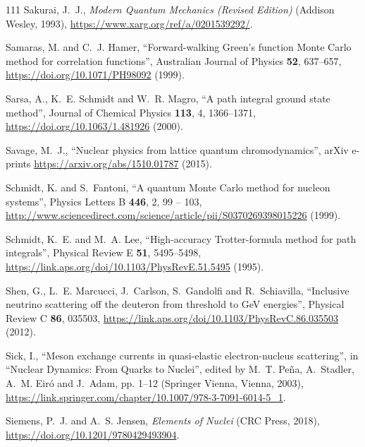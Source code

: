 \documentclass[12pt,letterpaper,UTF8]{report}
\begin{document}
{\begin{thebibliography}{111}
Sakurai, J.~J., \emph{Modern Quantum Mechanics (Revised Edition)} (Addison
  Wesley, 1993), \urlprefix\url{https://www.xarg.org/ref/a/0201539292/}.

Samaras, M. and C.~J. Hamer, \enquote{Forward-walking {Green}'s function
  {Monte} {Carlo} method for correlation functions}, Australian Journal of
  Physics \textbf{52}, 637--657,
  \urlprefix\url{https://doi.org/10.1071/PH98092} (1999).

Sarsa, A., K.~E. Schmidt and W.~R. Magro, \enquote{A path integral ground state
  method}, Journal of Chemical Physics \textbf{113}, 4, 1366--1371,
  \urlprefix\url{https://doi.org/10.1063/1.481926} (2000).

Savage, M.~J., \enquote{Nuclear physics from lattice quantum chromodynamics},
  arXiv e-prints \urlprefix\url{https://arxiv.org/abs/1510.01787} (2015).

Schmidt, K. and S.~Fantoni, \enquote{A quantum {Monte} {Carlo} method for
  nucleon systems}, Physics Letters B \textbf{446}, 2, 99 -- 103,
  \urlprefix\url{http://www.sciencedirect.com/science/article/pii/S0370269398015226}
  (1999).

Schmidt, K.~E. and M.~A. Lee, \enquote{High-accuracy {Trotter}-formula method
  for path integrals}, Physical Review E \textbf{51}, 5495--5498,
  \urlprefix\url{https://link.aps.org/doi/10.1103/PhysRevE.51.5495} (1995).

Shen, G., L.~E. Marcucci, J.~Carlson, S.~Gandolfi and R.~Schiavilla,
  \enquote{Inclusive neutrino scattering off the deuteron from threshold to
  {GeV} energies}, Physical Review C \textbf{86}, 035503,
  \urlprefix\url{https://link.aps.org/doi/10.1103/PhysRevC.86.035503} (2012).

Sick, I., \enquote{Meson exchange currents in quasi-elastic electron-nucleus
  scattering}, in \enquote{Nuclear Dynamics: From Quarks to Nuclei}, edited by
  M.~T. Pe{\~{n}}a, A.~Stadler, A.~M. Eir{\'o} and J.~Adam, pp. 1--12 (Springer
  Vienna, Vienna, 2003),
  \urlprefix\url{https://link.springer.com/chapter/10.1007/978-3-7091-6014-5_1}.

Siemens, P.~J. and A.~S. Jensen, \emph{Elements of Nuclei} ({CRC} Press, 2018),
  \urlprefix\url{https://doi.org/10.1201/9780429493904}.


\end{thebibliography}}
\end{document}
